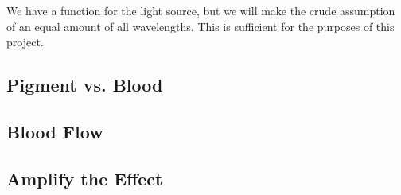 We have a function for the light source, but we will make the crude assumption of an equal amount of all wavelengths. This is sufficient for the purposes of this project.

\subsection{Pigment vs. Blood}\label{sec:PigmentVs.Blood}

\subsection{Blood Flow}\label{sec:BloodFlow}

\subsection{Amplify the Effect}\label{sec:AmplifyTheEffect}


